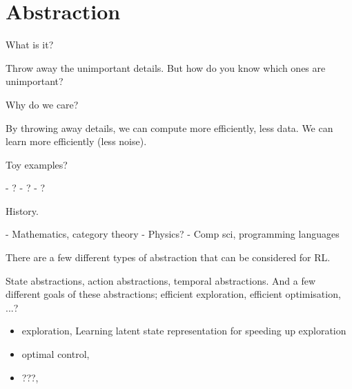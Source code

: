 \chapter{Abstraction}\label{C:abstraction}

What is it?

Throw away the unimportant details. But how do you know which ones are unimportant?

Why do we care?

By throwing away details, we can compute more efficiently, less data.
We can learn more efficiently (less noise).


Toy examples?

- ?
- ?
- ?

History.

- Mathematics, category theory
- Physics?
- Comp sci, programming languages


There are a few different types of abstraction that can be considered for RL.

State abstractions, action abstractions, temporal abstractions.
And a few different goals of these abstractions; efficient exploration, efficient optimisation, ...?


\begin{itemize}
\tightlist
\item
  exploration, Learning latent state representation for speeding up exploration \cite{Vezzani2019}
\item
  optimal control,
\item
  ???,
\end{itemize}
